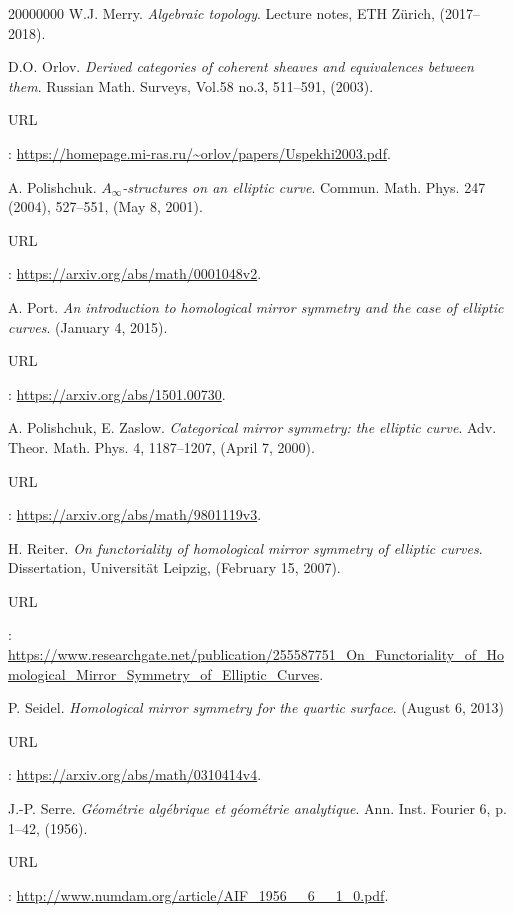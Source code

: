 \begin{thebibliography}{20000000}
\bibitem[Mer18]{[Mer18]} W.J. Merry. \textit{Algebraic topology}. Lecture notes, ETH Zürich, (2017--2018).

\bibitem[Orl03]{[Orl03]} D.O. Orlov. \textit{Derived categories of coherent sheaves and equivalences between them}. Russian Math. Surveys, Vol.58 no.3, 511--591, (2003).
\begin{footnotesize}URL\end{footnotesize}: \url{https://homepage.mi-ras.ru/~orlov/papers/Uspekhi2003.pdf}. 

\bibitem[Pol01]{[Pol01]} A. Polishchuk. \textit{$A_\infty$-structures on an elliptic curve}. Commun. Math. Phys. 247 (2004), 527--551, (May 8, 2001). \begin{footnotesize}URL\end{footnotesize}: \url{https://arxiv.org/abs/math/0001048v2}. 

\bibitem[Por15]{[Por15]} A. Port. \textit{An introduction to homological mirror symmetry and the case of elliptic curves}. (January 4, 2015). \begin{footnotesize}URL\end{footnotesize}: \url{https://arxiv.org/abs/1501.00730}.

\bibitem[PZ00]{[PZ00]} A. Polishchuk, E. Zaslow. \textit{Categorical mirror symmetry: the elliptic curve}. Adv. Theor. Math. Phys. 4, 1187--1207, (April 7, 2000). \begin{footnotesize}URL\end{footnotesize}: \url{https://arxiv.org/abs/math/9801119v3}.

\bibitem[Rei07]{[Rei07]} H. Reiter. \textit{On functoriality of homological mirror symmetry of elliptic curves}. Dissertation, Universität Leipzig, (February 15, 2007). \begin{footnotesize}URL\end{footnotesize}: \url{https://www.researchgate.net/publication/255587751_On_Functoriality_of_Homological_Mirror_Symmetry_of_Elliptic_Curves}.

\bibitem[Sei13]{[Sei13]} P. Seidel. \textit{Homological mirror symmetry for the quartic surface}. (August 6, 2013) \begin{footnotesize}URL\end{footnotesize}: \url{https://arxiv.org/abs/math/0310414v4}.

\bibitem[Ser56]{[Ser56]} J.-P. Serre. \textit{Géométrie algébrique et géométrie analytique}. Ann. Inst. Fourier 6, p. 1--42, (1956). \begin{footnotesize}URL\end{footnotesize}: \url{http://www.numdam.org/article/AIF_1956__6__1_0.pdf}.


\end{thebibliography}
